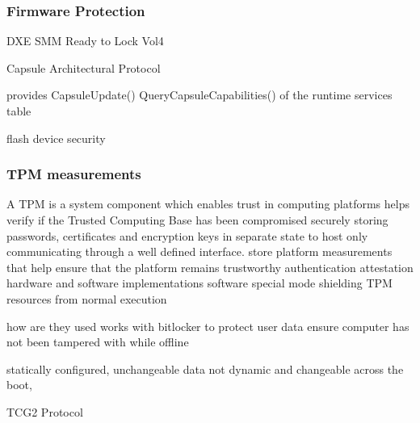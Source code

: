 \subsubsection{Firmware Protection}


DXE SMM Ready to Lock Vol4

Capsule Architectural Protocol

provides
CapsuleUpdate()
QueryCapsuleCapabilities()
of the runtime services table

flash device security

\subsubsection{TPM measurements}

A \acf{TPM} is a system component which enables trust in computing platforms
helps verify if the Trusted Computing Base has been compromised
securely storing passwords, certificates and encryption keys in separate state to host
only communicating through a well defined interface.
store platform measurements that help ensure that the platform remains trustworthy
authentication
attestation
hardware and software implementations
software special mode shielding TPM resources from normal execution
\cite{tcg-tpm-summary}
\cite{tcg-tpm-library-part1-architecture}

how are they used
works with bitlocker to protect user data
ensure computer has not been tampered with while offline

statically configured, unchangeable data
not dynamic and changeable across the boot,
\cite{tianocore-trusted-boot-chain}

\cite{tianocore-trusted-boot-chain}

TCG2 Protocol
\cite{tcg-efi-protocol}

